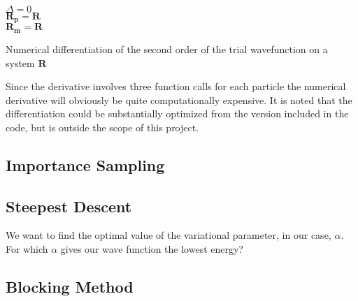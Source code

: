 \begin{algorithm}
\BlankLine
$\Delta = 0$ \\
$\mathbf{R_p} = \mathbf{R}$\\
$\mathbf{R_m} = \mathbf{R}$\\
\BlankLine
{}
\BlankLine
\caption{Numerical differentiation of the second order of the trial wavefunction on a system $\mathbf{R}$}\label{alg:nd}
\end{algorithm} 

Since the derivative involves three function calls for each particle the numerical derivative will obviously be quite computationally expensive. It is noted  that the differentiation could be substantially optimized from the version included in the code, but is outside the scope of this project. 

\subsection{Importance Sampling}

\subsection{Steepest Descent}

We want to find the optimal value of the variational parameter, in our case, $\alpha$. For which $\alpha$ gives our wave function the lowest energy?

\subsection{Blocking Method}

